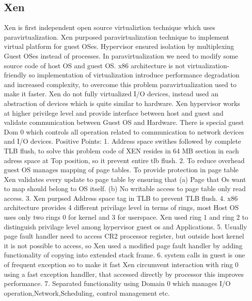 \documentclass[seminar,twoside]{iitbreport}
\begin{document}
\subsection{Xen}
Xen is first independent open source virtualiztion technique which uses paravirtualization. 
Xen purposed paravirtualization technique to implement virtual platform for guest
OSes. Hypervisor ensured isolation by multiplexing Guest OSes instead of processes.
In paravirtualization we need to modify some source code of host OS and guest
OS. x86 architecture is not virtualization-friendly 
so implementation of virtualization introduce performance degradation and increased complexity, 
to overcome this problem paravirtualization used to make it faster. 
Xen do not fully virtualized I/O devices, instead used an abstraction of devices which is quite similar to hardware. 
Xen hypervisor works at higher privilege level and provide interface between host and guest and 
validate communication between Guest OS and Hardware. There is special guest Dom 0 which controls all operation 
related to communication to network devices and I/O devices. 
Positive Points:
1. Address space swithes followed by complete TLB flush, to solve this problem code of XEN resides in 64 MB section in each adress space at Top position, 
so it prevent entire tlb flush.
2. To reduce overhead guest OS manages mapping of page tables.
To provide protection in page table Xen validates every update to page table by ensuring that (a) Page that Os want to map should belong to OS itself.
(b) No writable access to page table only read access.
3. Xen purpsed Address space tag in TLB to prevent TLB flush.
4. x86 architecture provides 4 different privilage level in terms of rings, 
most Host OS uses only two rings 0 for kernel and 3 for userspace. 
Xen used ring 1 and ring 2 to distinguish privilage level among hypervisor guest os and Applications.
5. Usually page fault handler need to access CR2 processor register, 
but outside host kernel it is not possible to access, so Xen used a modified page fault handler 
by adding functionality of copying into extended stack frame.
6. system calls in guest is one of frequent exception so to make it fast 
Xen circumvent interaction with ring 0 using a fast exception handller, that accessed directly by processor this improves performance.
7. Separated functionality using Domain 0 which manages I/O operation,Network,Scheduling, control management etc.
\end{document}
